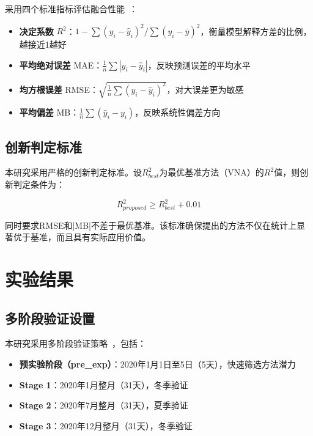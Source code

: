 \documentclass[UTF8, a4paper, 12pt]{article}
\begin{document}
采用四个标准指标评估融合性能~\cite{liu2019spatial}：

\begin{itemize}
    \item \textbf{决定系数} $R^2$：$1 - \sum(y_i - \hat{y}_i)^2 / \sum(y_i - \bar{y})^2$，衡量模型解释方差的比例，越接近1越好

    \item \textbf{平均绝对误差} MAE：$\frac{1}{n}\sum|y_i - \hat{y}_i|$，反映预测误差的平均水平

    \item \textbf{均方根误差} RMSE：$\sqrt{\frac{1}{n}\sum(y_i - \hat{y}_i)^2}$，对大误差更为敏感

    \item \textbf{平均偏差} MB：$\frac{1}{n}\sum(\hat{y}_i - y_i)$，反映系统性偏差方向
\end{itemize}

\subsection{创新判定标准}

本研究采用严格的创新判定标准。设$R^2_{best}$为最优基准方法（VNA）的$R^2$值，则创新判定条件为：

\begin{equation}
R^2_{proposed} \geq R^2_{best} + 0.01
\end{equation}

同时要求RMSE和|MB|不差于最优基准。该标准确保提出的方法不仅在统计上显著优于基准，而且具有实际应用价值。

\section{实验结果}

\subsection{多阶段验证设置}

本研究采用多阶段验证策略~\cite{rodriguez2025downscaling}，包括：

\begin{itemize}
    \item \textbf{预实验阶段（pre\_exp）}：2020年1月1日至5日（5天），快速筛选方法潜力
    \item \textbf{Stage 1}：2020年1月整月（31天），冬季验证
    \item \textbf{Stage 2}：2020年7月整月（31天），夏季验证
    \item \textbf{Stage 3}：2020年12月整月（31天），冬季验证
\end{itemize}
\end{document}
